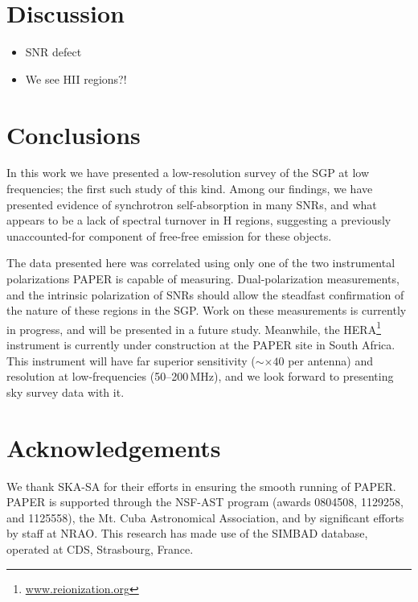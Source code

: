 \documentclass[useAMS,usenatbib]{mn2e}
\begin{document}
\section{Discussion}
\label{sec:disc}

\begin{itemize}
\item SNR defect
\item We see HII regions?!
\end{itemize}

\section{Conclusions}
\label{sec:conc}

In this work we have presented a low-resolution survey of the SGP at low frequencies; the first such study of this kind. Among our findings, we have presented evidence of synchrotron self-absorption in many SNRs, and what appears to be a lack of spectral turnover in {H} regions, suggesting a previously unaccounted-for component of free-free emission for these objects.

The data presented here was correlated using only one of the two instrumental polarizations PAPER is capable of measuring. Dual-polarization measurements, and the intrinsic polarization of SNRs \citep[e.g.][]{Gao_v.11} should allow the steadfast confirmation of the nature of these regions in the SGP. Work on these measurements is currently in progress, and will be presented in a future study. Meanwhile, the HERA\footnote{\url{www.reionization.org}} instrument is currently under construction at the PAPER site in South Africa. This instrument will have far superior sensitivity ($\sim\times40$ per antenna) and resolution at low-frequencies (50--200\,MHz), and we look forward to presenting sky survey data with it.

\section*{Acknowledgements}
We thank SKA-SA for their efforts in ensuring the smooth running of PAPER. PAPER is supported through the NSF-AST program (awards 0804508, 1129258, and 1125558), the Mt. Cuba Astronomical Association, and by significant efforts by staff at NRAO. This research has made use of the SIMBAD database, operated at CDS, Strasbourg, France.


{}
\end{document}
